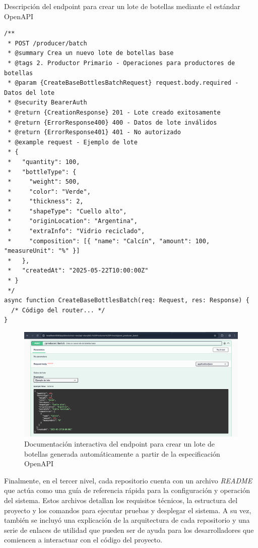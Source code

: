 \begin{listing}[!htb]
\caption{Descripción del endpoint para crear un lote de botellas mediante el estándar OpenAPI}
\label{listing:openapi-create-batch-code}
\begin{verbatim}
/** 
 * POST /producer/batch
 * @summary Crea un nuevo lote de botellas base
 * @tags 2. Productor Primario - Operaciones para productores de botellas
 * @param {CreateBaseBottlesBatchRequest} request.body.required - Datos del lote
 * @security BearerAuth
 * @return {CreationResponse} 201 - Lote creado exitosamente
 * @return {ErrorResponse400} 400 - Datos de lote inválidos
 * @return {ErrorResponse401} 401 - No autorizado
 * @example request - Ejemplo de lote
 * {
 *   "quantity": 100,
 *   "bottleType": {
 *     "weight": 500,
 *     "color": "Verde",
 *     "thickness": 2,
 *     "shapeType": "Cuello alto",
 *     "originLocation": "Argentina",
 *     "extraInfo": "Vidrio reciclado",
 *     "composition": [{ "name": "Calcín", "amount": 100, "measureUnit": "%" }]
 *   },
 *   "createdAt": "2025-05-22T10:00:00Z"
 * } 
 */
async function CreateBaseBottlesBatch(req: Request, res: Response) { 
  /* Código del router... */ 
}
\end{verbatim}
\end{listing}

\begin{figure}[!htb]
	\centering
	\includegraphics[width=\textwidth]{Figures/openapi-endpoint.png}
	\caption{Documentación interactiva del endpoint para crear un lote de botellas generada automáticamente a partir de la especificación OpenAPI}
	\label{fig:openapi-docs}
\end{figure}

Finalmente, en el tercer nivel, cada repositorio cuenta con un archivo \textit{README} que actúa como una guía de referencia rápida para la configuración y operación del sistema. Estos archivos detallan los requisitos técnicos, la estructura del proyecto y los comandos para ejecutar pruebas y desplegar el sistema. A su vez, también se incluyó una explicación de la arquitectura de cada repositorio y una serie de enlaces de utilidad que pueden ser de ayuda para los desarrolladores que comiencen a interactuar con el código del proyecto.

